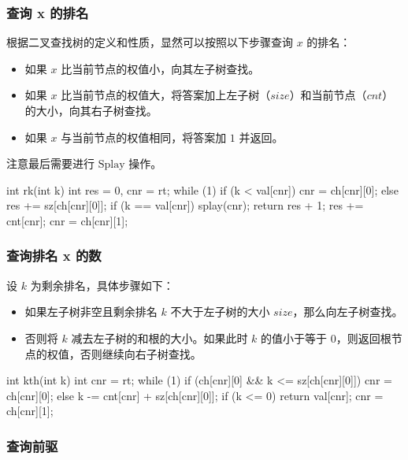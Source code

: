 \subsubsection{查询 x 的排名}

根据二叉查找树的定义和性质，显然可以按照以下步骤查询 $x$ 的排名：

\begin{itemize}
\item 如果 $x$ 比当前节点的权值小，向其左子树查找。
\item 如果 $x$ 比当前节点的权值大，将答案加上左子树（$size$）和当前节点（$cnt$）的大小，向其右子树查找。
\item 如果 $x$ 与当前节点的权值相同，将答案加 $1$ 并返回。
\end{itemize}

注意最后需要进行 $\text{Splay}$ 操作。

\begin{cppcode}
int rk(int k) {
  int res = 0, cnr = rt;
  while (1) {
    if (k < val[cnr]) {
      cnr = ch[cnr][0];
    } else {
      res += sz[ch[cnr][0]];
      if (k == val[cnr]) {
        splay(cnr);
        return res + 1;
      }
      res += cnt[cnr];
      cnr = ch[cnr][1];
    }
  }
}
\end{cppcode}

\subsubsection{查询排名 x 的数}

设 $k$ 为剩余排名，具体步骤如下：

\begin{itemize}
\item 如果左子树非空且剩余排名 $k$ 不大于左子树的大小 $size$，那么向左子树查找。
\item 否则将 $k$ 减去左子树的和根的大小。如果此时 $k$ 的值小于等于 $0$，则返回根节点的权值，否则继续向右子树查找。
\end{itemize}

\begin{cppcode}
int kth(int k) {
  int cnr = rt;
  while (1) {
    if (ch[cnr][0] && k <= sz[ch[cnr][0]]) {
      cnr = ch[cnr][0];
    } else {
      k -= cnt[cnr] + sz[ch[cnr][0]];
      if (k <= 0) return val[cnr];
      cnr = ch[cnr][1];
    }
  }
}
\end{cppcode}

\subsubsection{查询前驱}

